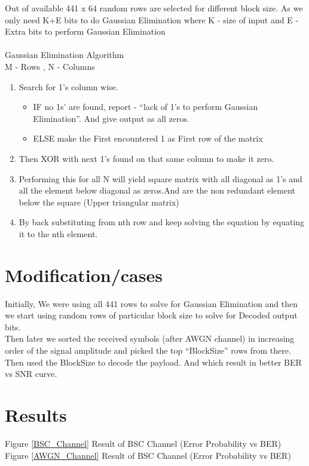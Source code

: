 \documentclass[12pt,a4paper,onecolumn]{article}
\begin{document}
Out of available 441 x 64 random rows are selected for different block size. As we only need K+E bits to do Gaussian Elimination where K - size of input and E - Extra bits to perform Gaussian Elimination
\\
\\
Gaussian Elimination Algorithm 
\\M - Rows , N - Columns
\begin{enumerate}
\item Search for 1’s column wise.
\begin{itemize}
\item IF no 1s’ are found, report - “lack of 1’s to perform Gaussian Elimination”. And give output as all zeros.
\item ELSE make the First encountered 1 as First row of the matrix
\end{itemize}
\item Then XOR with next 1’s found on that same column to make it zero.
\item Performing this for all N will yield square matrix with all diagonal as 1’s and all the element below diagonal as zeros.And are the non redundant element below the square (Upper triangular matrix)
\item By back substituting from nth row and  keep solving the equation by equating it to the nth element.
\end{enumerate}
\section{Modification/cases}
Initially, We were using all 441 rows to solve for Gaussian Elimination and then we start using random rows of particular block size to solve for Decoded output bits.
\\
Then later we sorted the received symbols (after AWGN channel) in increasing order of the signal amplitude and picked the top “BlockSize” rows from there. Then used the BlockSize to decode the payload. And which result in better BER vs SNR curve. 
\newpage
\section{Results}
Figure \ref{BSC_Channel} Result of BSC Channel (Error Probability vs BER)
Figure \ref{AWGN_Channel} Result of BSC Channel (Error Probability vs BER)
\end{document}
